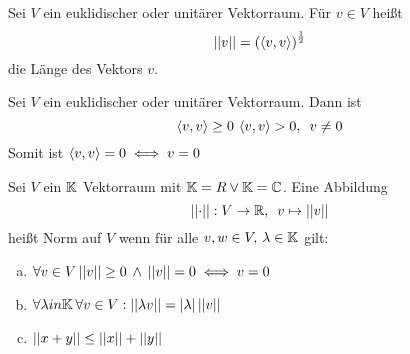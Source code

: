 \begin{definition}
    Sei $V$ ein euklidischer oder unitärer Vektorraum. Für $v\in V$ heißt \[
        \left\vert\left\vert v\right\vert\right\vert = \left(\left<v,v\right>\right)^\frac{1}{2}\]
    die Länge des Vektors $v$.
\end{definition}

\begin{remark}
    Sei $V$ ein euklidischer oder unitärer Vektorraum. Dann ist \[
        \left<v,v\right>\geq 0 \hspace{.2em} \left<v,v\right> > 0, \hspace{.5em} v\neq 0\]
    Somit ist $\left<v,v\right> = 0 \iff v = 0$ 
\end{remark}

\begin{definition}
    Sei $V$ ein $\mathbb{K}$ Vektorraum mit $\mathbb{K} = R \lor \mathbb{K} = \mathbb{C}$. Eine Abbildung\[
        \left\vert\left\vert\cdot\right\vert\right\vert: V\to \mathbb{R}, \hspace{.5em} v\mapsto \left\vert\left\vert v\right\vert\right\vert\]
    heißt Norm auf $V$ wenn für alle $v,w \in V, \hspace{.2em} \lambda \in \mathbb{K}$ 
    gilt:\begin{enumerate}[(a)]
        \item $\forall v \in V \left\vert\left\vert v\right\vert\right\vert \geq 0 \hspace{.2em} \land\hspace{.2em} 
        \left\vert\left\vert v\right\vert\right\vert = 0 \iff v=0$
        \item $\forall \lambda in \mathbb{K} \hspace{.2em} \forall v \in V: \left\vert\left\vert\lambda v\right\vert\right\vert
         = \left\vert \lambda \right\vert \left\vert\left\vert v\right\vert\right\vert$
        \item $\left\vert\left\vert x+y\right\vert\right\vert \leq \left\vert\left\vert x\right\vert\right\vert + \left\vert\left\vert y\right\vert\right\vert$
    \end{enumerate}
\end{definition}

